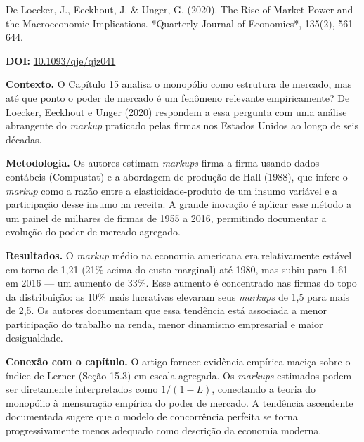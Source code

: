 \documentclass[11pt,twoside,openright]{book}
\begin{document}
\begin{pesquisabox}{De Loecker, J., Eeckhout, J. & Unger, G. (2020). The Rise of Market Power and the Macroeconomic Implications. *Quarterly Journal of Economics*, 135(2), 561–644.}

\textbf{DOI:}
\href{https://doi.org/10.1093/qje/qjz041}{10.1093/qje/qjz041}

\textbf{Contexto.} O Capítulo 15 analisa o monopólio como estrutura de
mercado, mas até que ponto o poder de mercado é um fenômeno relevante
empiricamente? De Loecker, Eeckhout e Unger (2020) respondem a essa
pergunta com uma análise abrangente do \emph{markup} praticado pelas
firmas nos Estados Unidos ao longo de seis décadas.

\textbf{Metodologia.} Os autores estimam \emph{markups} firma a firma
usando dados contábeis (Compustat) e a abordagem de produção de Hall
(1988), que infere o \emph{markup} como a razão entre a
elasticidade-produto de um insumo variável e a participação desse insumo
na receita. A grande inovação é aplicar esse método a um painel de
milhares de firmas de 1955 a 2016, permitindo documentar a evolução do
poder de mercado agregado.

\textbf{Resultados.} O \emph{markup} médio na economia americana era
relativamente estável em torno de 1,21 (21\% acima do custo marginal)
até 1980, mas subiu para 1,61 em 2016 --- um aumento de 33\%. Esse
aumento é concentrado nas firmas do topo da distribuição: as 10\% mais
lucrativas elevaram seus \emph{markups} de 1,5 para mais de 2,5. Os
autores documentam que essa tendência está associada a menor
participação do trabalho na renda, menor dinamismo empresarial e maior
desigualdade.

\textbf{Conexão com o capítulo.} O artigo fornece evidência empírica
maciça sobre o índice de Lerner (Seção 15.3) em escala agregada. Os
\emph{markups} estimados podem ser diretamente interpretados como
\(1/(1 - L)\), conectando a teoria do monopólio à mensuração empírica do
poder de mercado. A tendência ascendente documentada sugere que o modelo
de concorrência perfeita se torna progressivamente menos adequado como
descrição da economia moderna.

\end{pesquisabox}
\end{document}
